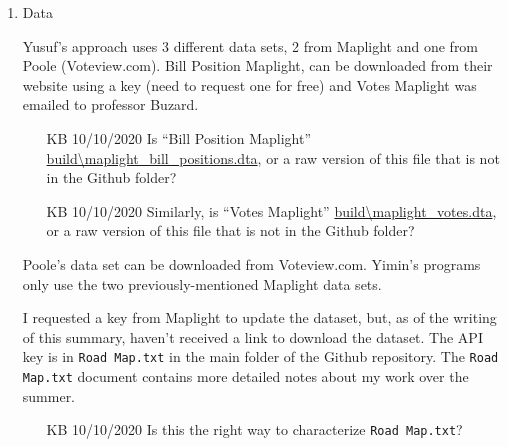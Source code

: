 \documentclass[a4paper,12pt]{article}
\begin{document}
\begin{enumerate}
\item Data

Yusuf's approach uses 3 different data sets, 2 from Maplight and one from Poole (Voteview.com). Bill Position Maplight, can be downloaded from their website using a key (need to request one for free) and Votes Maplight was emailed to professor Buzard.
\begin{itemize}
	\item [KB 10/10/2020] Is ``Bill Position Maplight'' \url{build\maplight_bill_positions.dta}, or a raw version of this file that is not in the Github folder?
	\item [KB 10/10/2020] Similarly, is ``Votes Maplight'' \url{build\maplight_votes.dta}, or a raw version of this file that is not in the Github folder?
\end{itemize}
Poole’s data set can be downloaded from Voteview.com.
Yimin’s programs only use the two previously-mentioned Maplight data sets.

I requested a key from Maplight to update the dataset, but, as of the writing of this summary, haven’t received a link to download the dataset. The API key is in \texttt{Road Map.txt} in the main folder of the Github repository. The \texttt{Road Map.txt} document contains more detailed notes about my work over the summer.
\begin{itemize}
	\item [KB 10/10/2020] Is this the right way to characterize \texttt{Road Map.txt}?
\end{itemize}


\end{enumerate}
\end{document}
